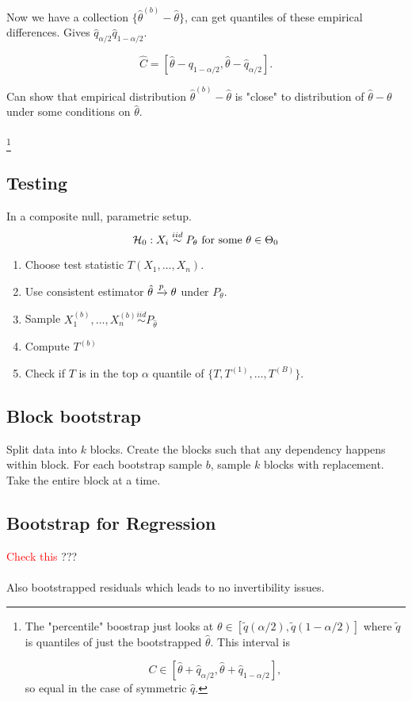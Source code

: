 \documentclass{article}
\newcommand\myworries[1]{\textcolor{red}{#1}}
\newcommand{\simiid}{\overset{iid}\sim }
\begin{document}
Now we have a collection $\{\hat \theta^{(b)} - \hat \theta\}$, can get quantiles of these empirical differences. Gives $\hat q_{\alpha/2} \hat q_{1-\alpha/2}$. 

$$\hat C = [\hat \theta - q_{1-\alpha/2}, \hat \theta -\hat q_{\alpha/ 2}].$$

Can show that empirical distribution $\hat \theta ^{(b)}- \hat \theta$ is "close" to distribution of $\hat \theta - \theta$ under some conditions on $\hat \theta$. \\\\

\footnote{The "percentile" boostrap just looks at $\theta \in [\tilde q (\alpha/2), \tilde q(1-\alpha/2)]$ where $\tilde q$ is quantiles of just the bootstrapped $\hat \theta$. This interval is 

$$C\in [\hat \theta + \hat q_{\alpha/2}, \hat \theta + \hat q _{1-\alpha/2}],$$
so equal in the case of symmetric $\hat q$. }


\subsection{Testing}
In a composite null, parametric setup. 
$$\calH_0: X_i \simiid P_{\theta} \text{ for some } \theta\in \Theta_0$$

\begin{enumerate}
	\item Choose test statistic $T(X_1,\ldots, X_n)$. 
	\item Use consistent estimator $\hat \theta \xrightarrow{p} \theta$ under $P_\theta$. 
	\item Sample $X_1^{(b)}, \ldots, X_n^{(b)} \simiid P_{\hat \theta}$
	\item Compute $T^{(b)}$
	\item Check if $T$ is in the top $\alpha$ quantile of $\{T,T^{(1)},\ldots, T^{(B)}\}$. 
\end{enumerate}



\subsection{Block bootstrap}
Split data into $k$ blocks. Create the blocks such that any dependency happens within block. For each bootstrap sample $b$, sample $k$ blocks with replacement. Take the entire block at a time. 


\subsection{Bootstrap for Regression}
\myworries{Check this} ???\\ \\ 

Also bootstrapped residuals which leads to no invertibility issues. 
\end{document}
